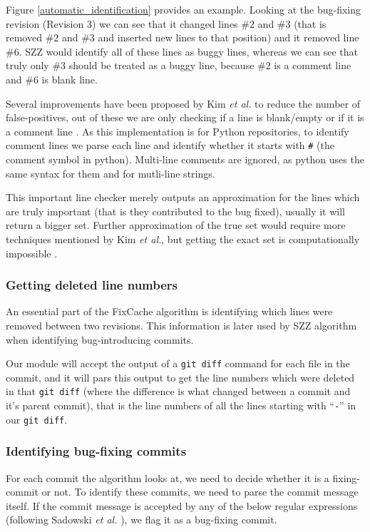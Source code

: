 \documentclass[12pt,twoside,notitlepage]{report}
\newcommand{\fxch}{FixCache}
\newcommand{\etal}{\textit{et al.}}
\begin{document}
Figure \ref{automatic_identification} provides an example. Looking at the bug-fixing revision (Revision 3) we can see that it changed lines \#2 and \#3 (that is removed \#2 and \#3 and inserted new lines to that position) and it removed line \#6.
SZZ would identify all of these lines as buggy lines, whereas we can see that truly only \#3 should be treated as a buggy line, because \#2 is a comment line and \#6 is blank line.

Several improvements have been proposed by Kim \etal{} to reduce the number of false-positives, out of these we are only checking if a line is blank/empty or if it is a comment line \cite{KimZim}. As this implementation is for Python repositories, to identify comment lines we parse each line and identify whether it starts with \texttt{\#} (the comment symbol in python). Multi-line comments are ignored, as python uses the same syntax for them and for mutli-line strings. 

This important line checker merely outputs an approximation for the lines which are truly important (that is they contributed to the bug fixed), usually it will return a bigger set. Further approximation of the true set would require more techniques mentioned by Kim \etal{}, but getting the exact set is computationally impossible \cite{KimZim}. 
\subsubsection*{Getting deleted line numbers}
An essential part of the \fxch{} algorithm is identifying which lines were removed between two revisions. This information is later used by SZZ algorithm when identifying bug-introducing commits.

Our module will accept the output of a \texttt{git diff} command for each file in the commit, and it will pars this output to get the line numbers which were deleted in that \texttt{git diff} (where the difference is what changed between a commit and it's parent commit), that is the line numbers of all the lines starting with ``\texttt{-}'' in our \texttt{git diff}.
\subsubsection*{Identifying bug-fixing commits}
For each commit the algorithm looks at, we need to decide whether it is a fixing-commit or not. To identify these commits, we need to parse the commit message itself. If the commit message is accepted by any of the below regular expressions (following Sadowski \etal{} \cite{Sadowski}), we flag it as a bug-fixing commit. 
\end{document}

